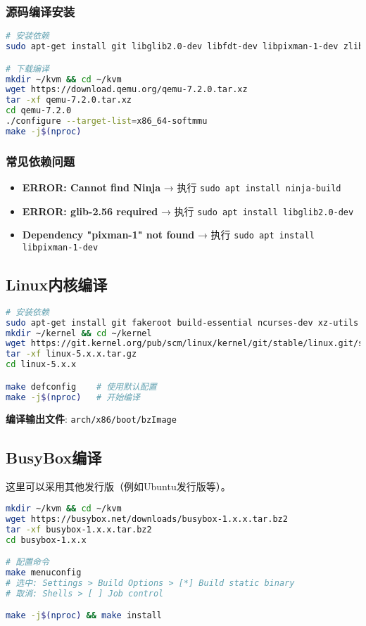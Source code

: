 \subsubsection{源码编译安装}
\begin{lstlisting}[language=bash]
# 安装依赖
sudo apt-get install git libglib2.0-dev libfdt-dev libpixman-1-dev zlib1g-dev ninja-build

# 下载编译
mkdir ~/kvm && cd ~/kvm
wget https://download.qemu.org/qemu-7.2.0.tar.xz
tar -xf qemu-7.2.0.tar.xz
cd qemu-7.2.0
./configure --target-list=x86_64-softmmu
make -j$(nproc)
\end{lstlisting}

\subsubsection{常见依赖问题}
\begin{itemize}
    \item \textbf{ERROR: Cannot find Ninja} → 执行 \texttt{sudo apt install ninja-build}
    \item \textbf{ERROR: glib-2.56 required} → 执行 \texttt{sudo apt install libglib2.0-dev}
    \item \textbf{Dependency "pixman-1" not found} → 执行 \texttt{sudo apt install libpixman-1-dev}
\end{itemize}

\subsection{Linux内核编译}
\begin{lstlisting}[language=bash]
# 安装依赖
sudo apt-get install git fakeroot build-essential ncurses-dev xz-utils libssl-dev bc flex libelf-dev bison 
mkdir ~/kernel && cd ~/kernel
wget https://git.kernel.org/pub/scm/linux/kernel/git/stable/linux.git/snapshot/linux-5.x.x.tar.gz
tar -xf linux-5.x.x.tar.gz
cd linux-5.x.x

make defconfig    # 使用默认配置
make -j$(nproc)   # 开始编译
\end{lstlisting}

\textbf{编译输出文件}: \texttt{arch/x86/boot/bzImage}

\subsection{BusyBox编译}
这里可以采用其他发行版（例如Ubuntu发行版等）。
\begin{lstlisting}[language=bash]
mkdir ~/kvm && cd ~/kvm
wget https://busybox.net/downloads/busybox-1.x.x.tar.bz2
tar -xf busybox-1.x.x.tar.bz2
cd busybox-1.x.x

# 配置命令
make menuconfig
# 选中: Settings > Build Options > [*] Build static binary
# 取消: Shells > [ ] Job control

make -j$(nproc) && make install
\end{lstlisting}

